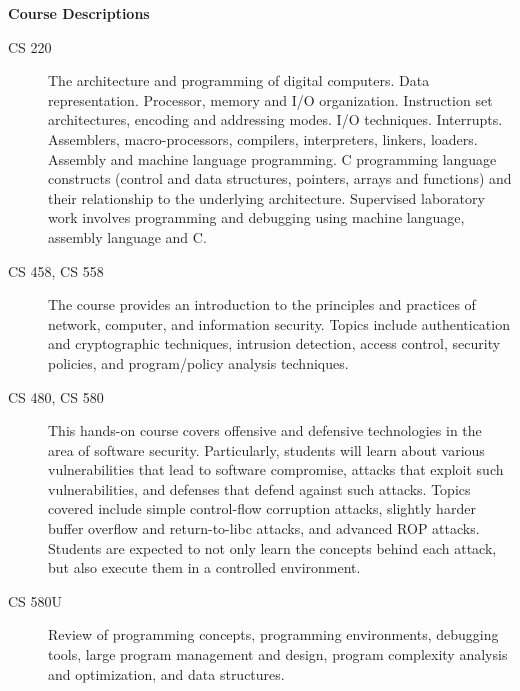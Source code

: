  \textbf{Course Descriptions}
 \begin{description}
 \item[CS 220] {The architecture and programming of digital computers. Data representation. Processor, memory and I/O organization. Instruction set architectures, encoding and addressing modes. I/O techniques. Interrupts. Assemblers, macro-processors, compilers, interpreters, linkers, loaders. Assembly and machine language programming. C programming language constructs (control and data structures, pointers, arrays and functions) and their relationship to the underlying architecture. Supervised laboratory work involves programming and debugging using machine language, assembly language and C.}
 \item[CS 458, CS 558] {The course provides an introduction to the principles and practices of network, computer, and information security. Topics include authentication and cryptographic techniques, intrusion detection, access control, security policies, and program/policy analysis techniques.}
 \item[CS 480, CS 580] {This hands-on course covers offensive and defensive technologies in the area of software security. Particularly, students will learn about various vulnerabilities that lead to software compromise, attacks that exploit such vulnerabilities, and defenses that defend against such attacks. Topics covered include simple control-flow corruption attacks, slightly harder buffer overflow and return-to-libc attacks, and advanced ROP attacks. Students are expected to not only learn the concepts behind each attack, but also execute them in a controlled environment.}
 \item[CS 580U] {Review of programming concepts, programming environments, debugging tools, large program management and design, program complexity analysis and optimization, and data structures.}
 \end{description}